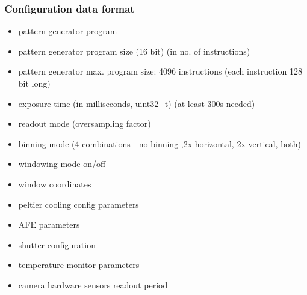 
\subsubsection{Configuration data format}

\begin{itemize}
\item pattern generator program
\item pattern generator program size (16 bit) (in no. of instructions)
\item pattern generator max. program size: 4096 instructions (each instruction 128 bit long)
\item exposure time (in milliseconds, uint32\_t) (at least 300s needed)
\item readout mode (oversampling factor)
\item binning mode (4 combinations - no binning ,2x horizontal, 2x vertical, both)
\item windowing mode on/off
\item window coordinates
\item peltier cooling config parameters
\item AFE parameters
\item shutter configuration
\item temperature monitor parameters
\item camera hardware sensors readout period
\end{itemize}

%

%

